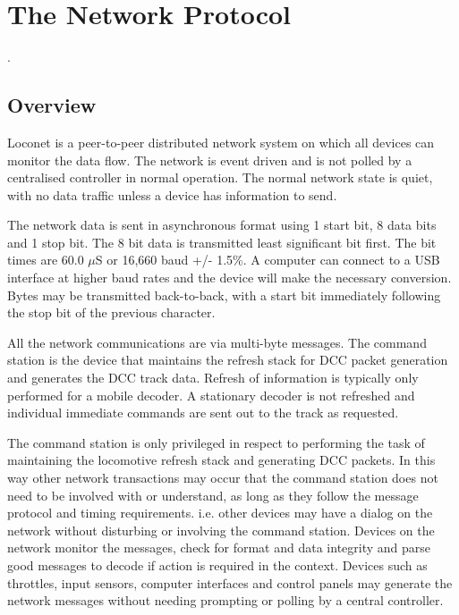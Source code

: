  

\chapter[Network Protocol]{The Network Protocol}.  

\section{Overview}

\Gls{Loconet} is a \gls{peer-to-peer} distributed network system on which all devices can monitor the data flow. The network is event driven and is not \gls{polled} by a centralised controller in normal operation. The normal network state is quiet, with no data traffic unless a device has information to send.

The network data is sent in asynchronous format using 1 start bit, 8 data bits and 1 stop bit. The 8 bit data is transmitted least significant bit first. The bit times are 60.0 $\mu$S or 16,660 baud +/- 1.5\%. A computer can connect to a USB interface at higher baud rates and the device will make the necessary conversion. Bytes may be transmitted back-to-back, with a start bit immediately following the stop bit of the previous character. 

All the network communications are via multi-byte messages. The \gls{command station} is the device that maintains the refresh stack for \gls{DCC} packet generation and generates the DCC track data. Refresh of information is typically only performed for a \gls{mobile decoder}. A \gls{stationary decoder} is not refreshed and individual immediate commands are sent out to the track as requested.

The command station is only privileged in respect to performing the task of maintaining the locomotive refresh stack and generating DCC packets. In this way other network transactions may occur that the command station does not need to be involved with or understand, as long as they follow the message protocol and timing requirements. i.e. other devices may have a dialog on the network without disturbing or involving the command station. Devices on the network monitor the messages, check for format and data integrity and parse good messages to decode if action is required in the context. Devices such as throttles, input sensors, computer interfaces and control panels may generate the network messages without needing prompting or \gls{polling} by a central controller.

